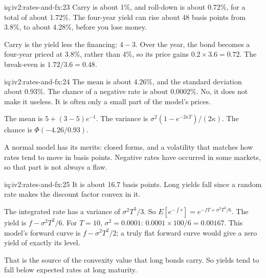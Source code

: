 \begin{solution}{iq:iv2:rates-and-fx:23}
Carry is about 1\%, and roll-down is about 0.72\%, for a total of about 1.72\%. The four-year yield can rise about 48 basis points from 3.8\%, to about 4.28\%, before you lose money.

Carry is the yield less the financing: $4 - 3$. Over the year, the bond becomes a four-year priced at 3.8\%, rather than 4\%, so its price gains $0.2 \times 3.6 = 0.72$. The break-even is $1.72/3.6 = 0.48$.

\end{solution}

\begin{solution}{iq:iv2:rates-and-fx:24}
The mean is about 4.26\%, and the standard deviation about 0.93\%. The chance of a negative rate is about 0.0002\%. No, it does not make it useless. It is often only a small part of the model's prices.

The mean is $5 + (3 - 5)e^{-1}$. The variance is $\sigma^2(1 - e^{-2\kappa T})/(2\kappa)$. The chance is $\Phi(-4.26/0.93)$.

A normal model has its merits: closed forms, and a volatility that matches how rates tend to move in basis points. Negative rates have occurred in some markets, so that part is not always a flaw.

\end{solution}

\begin{solution}{iq:iv2:rates-and-fx:25}
It is about 16.7 basis points. Long yields fall since a random rate makes the discount factor convex in it.

The integrated rate has a variance of $\sigma^2T^3/3$. So $E[e^{-\int r}] = e^{-f T + \sigma^2T^3/6}$. The yield is $f - \sigma^2T^2/6$. For $T = 10$, $\sigma^2 = 0.0001$: $0.0001 \times 100/6 = 0.00167$. This model's forward curve is $f - \sigma^2T^2/2$; a truly flat forward curve would give a zero yield of exactly its level.

That is the source of the convexity value that long bonds carry. So yields tend to fall below expected rates at long maturity.

\end{solution}

